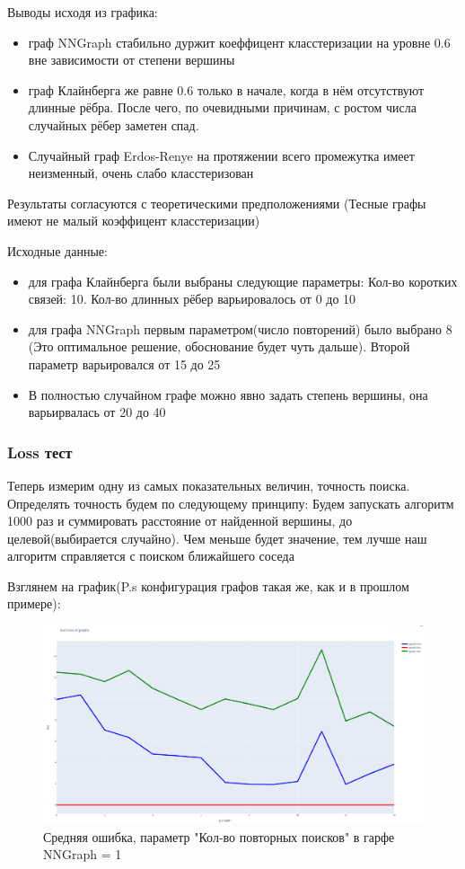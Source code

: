 Выводы исходя из графика:

\begin{itemize}
    \item граф NNGraph стабильно дуржит коеффицент класстеризации на уровне 0.6 вне
    зависимости от степени вершины 
    \item граф Клайнберга же равне 0.6 только в начале, когда в нём отсутствуют длинные рёбра.
    После чего, по очевидными причинам, с ростом числа случайных рёбер заметен спад.
    \item Случайный граф Erdos-Renye на протяжении всего промежутка имеет неизменный, очень
    слабо класстеризован
\end{itemize}
Результаты согласуются с теоретическими предположениями (Тесные графы имеют не малый коэффицент класстеризации)

Исходные данные:
\begin{itemize}
    \item для графа Клайнберга были выбраны следующие параметры: Кол-во коротких связей: 10. Кол-во длинных
рёбер варьировалось от 0 до 10
    \item для графа NNGraph первым параметром(число повторений) было выбрано 8 (Это оптимальное решение,
обоснование будет чуть дальше). Второй параметр варьировался от 15 до 25
    \item В полностью случайном графе можно явно задать степень вершины, она варьирвалась от 20 до 40
\end{itemize}

\subsubsection{Loss тест}

Теперь измерим одну из самых показательных величин, точность поиска.
Определять точность будем по следующему принципу: Будем запускать алгоритм 1000 раз и 
суммировать расстояние от найденной вершины, до целевой(выбирается случайно).
Чем меньше будет значение, тем лучше наш алгоритм справляется с поиском ближайшего соседа

Взглянем на график(P.s конфигурация графов такая же, как и в прошлом примере):
\begin{figure}[H]
    \centering
    \includegraphics[scale=0.25]{./pictures/sum_loss_imp1.png}
    \caption{Средняя ошибка, параметр "Кол-во повторных поисков" в гарфе NNGraph = 1 } \label{sum_loss}
\end{figure}


